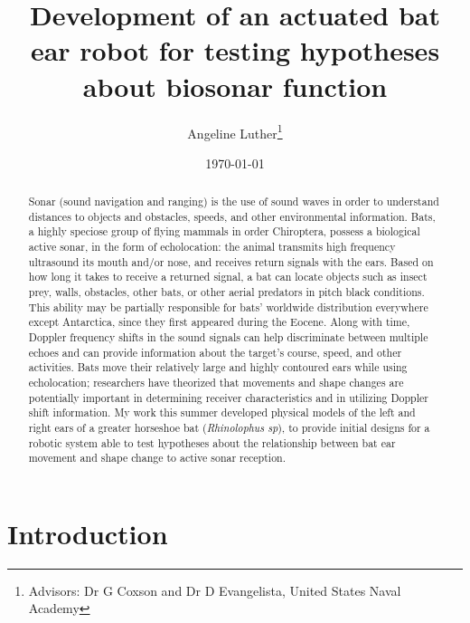 \documentclass{article}
\title{Development of an actuated bat ear robot for testing hypotheses about biosonar function}
\author{Angeline Luther\thanks{Advisors: Dr G Coxson and Dr D Evangelista, United States Naval Academy}}
\date{\today}
\begin{document}
\maketitle

\begin{abstract}
Sonar (sound navigation and ranging) is the use of sound waves in order to understand distances to objects and obstacles, speeds, and other environmental information.  Bats, a highly speciose group of flying mammals in order Chiroptera, possess a biological active sonar, in the form of echolocation: the animal transmits high frequency ultrasound its mouth and/or nose, and receives return signals with the ears.  Based on how long it takes to receive a returned signal, a bat can locate objects such as insect prey, walls, obstacles, other bats, or other aerial predators in pitch black conditions. This ability may be partially responsible for bats' worldwide distribution everywhere except Antarctica, since they first appeared during the Eocene. Along with time, Doppler frequency shifts in the sound signals can help discriminate between multiple echoes and can provide information about the target's course, speed, and other activities. Bats move their relatively large and highly contoured ears while using echolocation; researchers have theorized that movements and shape changes are potentially important in determining receiver characteristics and in utilizing Doppler shift information. My work this summer developed physical models of the left and right ears of a greater horseshoe bat (\emph{Rhinolophus sp}), to provide initial designs for a robotic system able to test hypotheses about the relationship between bat ear movement and shape change to active sonar reception.  
\end{abstract}

\section{Introduction}
\end{document}
